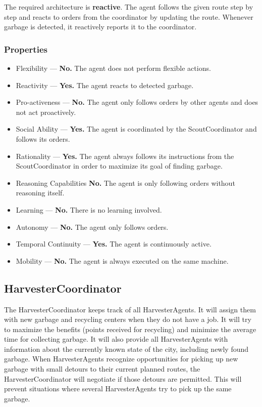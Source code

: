 The required architecture is \textbf{reactive}. The agent follows the given route step by step and reacts to orders from the coordinator by updating the route. Whenever garbage is detected, it reactively reports it to the coordinator.

\subsubsection*{Properties}

\begin{itemize}
	\item Flexibility — \textbf{No.} The agent does not perform flexible actions.
	\item Reactivity — \textbf{Yes.} The agent reacts to detected garbage.
	\item Pro-activeness — \textbf{No.} The agent only follows orders by other agents and does not act proactively.
	\item Social Ability — \textbf{Yes.} The agent is coordinated by the ScoutCoordinator and follows its orders.
	\item Rationality — \textbf{Yes.} The agent always follows its instructions from the ScoutCoordinator in order to maximize its goal of finding garbage.
	\item Reasoning Capabilities \textbf{No.} The agent is only following orders without reasoning itself.
	\item Learning — \textbf{No.} There is no learning involved.
	\item Autonomy — \textbf{No.} The agent only follows orders.
	\item Temporal Continuity — \textbf{Yes.} The agent is continuously active.
	\item Mobility — \textbf{No.} The agent is always executed on the same machine.
\end{itemize}

\subsection{HarvesterCoordinator}

The HarvesterCoordinator keeps track of all HarvesterAgents. It will assign them with new garbage and recycling centers when they do not have a job. It will try to maximize the benefits (points received for recycling) and minimize the average time for collecting garbage. It will also provide all HarvesterAgents with information about the currently known state of the city, including newly found garbage. When HarvesterAgents recognize opportunities for picking up new garbage with small detours to their current planned routes, the HarvesterCoordinator will negotiate if those detours are permitted. This will prevent situations where several HarvesterAgents try to pick up the same garbage.

